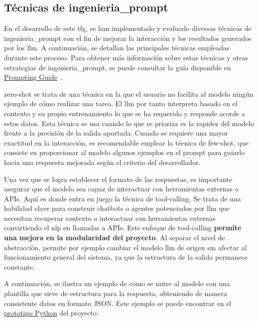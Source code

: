 	\subsection{Técnicas de \gls{ingenieria_prompt}}
	En el desarrollo de este \acrshort{tfg}, se han implementado y evaluado diversas técnicas de \gls{ingenieria_prompt} con el fin de mejorar la interacción y los resultados generados por los \acrshort{llm}. A continuación, se detallan las principales técnicas empleadas durante este proceso. Para obtener más información sobre estas técnicas y otras estrategias de \gls{ingenieria_prompt}, se puede consultar la guía disponible en \href{https://www.promptingguide.ai/es}{Prompting Guide}~\cite{promptingguide}.
	
	\gls{zero-shot} se trata de una técnica en la que el usuario no facilita al modelo ningún ejemplo de cómo realizar una tarea. El \acrshort{llm} por tanto interpreta basado en el contexto y su propio entrenamiento lo que se ha requerido y responde acorde a estos datos. Esta técnica se usa cuando lo que se prioriza es la rapidez del modelo frente a la precisión de la salida aportada. Cuando se requiere una mayor exactitud en la interacción, es recomendable emplear la técnica de \gls{few-shot}, que consiste en proporcionar al modelo algunos ejemplos en el prompt para guiarlo hacia una respuesta mejorada según el criterio del desarrollador.
	
	Una vez que se logra establecer el formato de las respuestas, es importante asegurar que el modelo sea capaz de interactuar con herramientas externas o APIs. Aquí es donde entra en juego la técnica de \gls{tool-calling}.
	Se trata de una habilidad clave para construir chatbots o agentes potenciados por \acrshort{llm} que necesitan recuperar contexto o interactuar con herramientas externas convirtiendo el \acrlong{nlp} en llamadas a APIs.
	Este enfoque de \gls{tool-calling} \textbf{permite una mejora en la modularidad del proyecto}. Al separar el nivel de abstracción, permite por ejemplo cambiar el modelo \acrshort{llm} de origen sin afectar al funcionamiento general del sistema, ya que la estructura de la salida permanece constante.

	A continuación, se ilustra un ejemplo de cómo se nutre al modelo con una plantilla que sirve de estructura para la respuesta, obteniendo de manera consistente datos en formato JSON. Este ejemplo se puede encontrar en el \href{https://github.com/fps1001/TFGII_FPisot/tree/main/project-prototypes/prompting.ipynb}{prototipo Python} del proyecto: 
	
